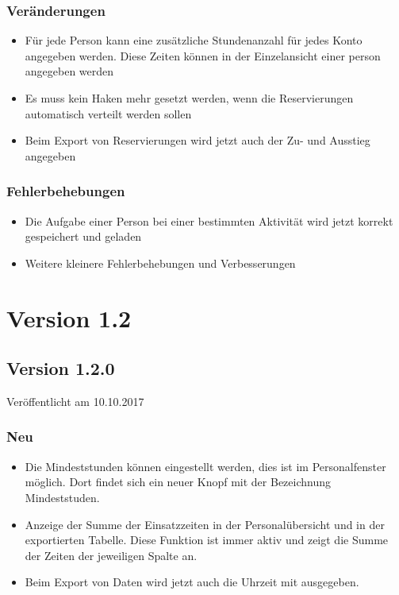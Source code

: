 \subsubsection{Veränderungen}
\begin{itemize}
  \item
  Für jede Person kann eine zusätzliche Stundenanzahl für jedes Konto angegeben werden. Diese Zeiten können in der Einzelansicht einer person angegeben werden
  \item
  Es muss kein Haken mehr gesetzt werden, wenn die Reservierungen automatisch verteilt werden sollen
  \item
  Beim Export von Reservierungen wird jetzt auch der Zu- und Ausstieg angegeben
\end{itemize}

\subsubsection{Fehlerbehebungen}
\begin{itemize}
  \item
  Die Aufgabe einer Person bei einer bestimmten Aktivität wird jetzt korrekt gespeichert und geladen
  \item
  Weitere kleinere Fehlerbehebungen und Verbesserungen
\end{itemize}



\section{Version 1.2}
\subsection{Version 1.2.0}
Veröffentlicht am 10.10.2017
\subsubsection{Neu}
\begin{itemize}
  \item
  Die Mindeststunden können eingestellt werden, dies ist im Personalfenster möglich. Dort findet sich ein neuer Knopf mit der Bezeichnung Mindeststuden.
  \item
  Anzeige der Summe der Einsatzzeiten in der Personalübersicht und in der exportierten Tabelle. Diese Funktion ist immer aktiv und zeigt die Summe der Zeiten der jeweiligen Spalte an.
  \item
  Beim Export von Daten wird jetzt auch die Uhrzeit mit ausgegeben.
\end{itemize}

